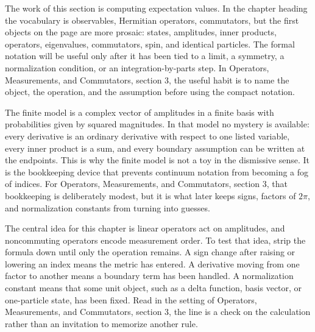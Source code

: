 











The work of this section is computing expectation values.  In the chapter heading the vocabulary is observables, Hermitian operators, commutators, but the first objects on the page are more prosaic: states, amplitudes, inner products, operators, eigenvalues, commutators, spin, and identical particles.  The formal notation will be useful only after it has been tied to a limit, a symmetry, a normalization condition, or an integration-by-parts step.  In Operators, Measurements, and Commutators, section 3, the useful habit is to name the object, the operation, and the assumption before using the compact notation.

The finite model is a complex vector of amplitudes in a finite basis with probabilities given by squared magnitudes.  In that model no mystery is available: every derivative is an ordinary derivative with respect to one listed variable, every inner product is a sum, and every boundary assumption can be written at the endpoints.  This is why the finite model is not a toy in the dismissive sense.  It is the bookkeeping device that prevents continuum notation from becoming a fog of indices.  For Operators, Measurements, and Commutators, section 3, that bookkeeping is deliberately modest, but it is what later keeps signs, factors of \(2\pi\), and normalization constants from turning into guesses.

The central idea for this chapter is linear operators act on amplitudes, and noncommuting operators encode measurement order.  To test that idea, strip the formula down until only the operation remains.  A sign change after raising or lowering an index means the metric has entered.  A derivative moving from one factor to another means a boundary term has been handled.  A normalization constant means that some unit object, such as a delta function, basis vector, or one-particle state, has been fixed.  Read in the setting of Operators, Measurements, and Commutators, section 3, the line is a check on the calculation rather than an invitation to memorize another rule.

